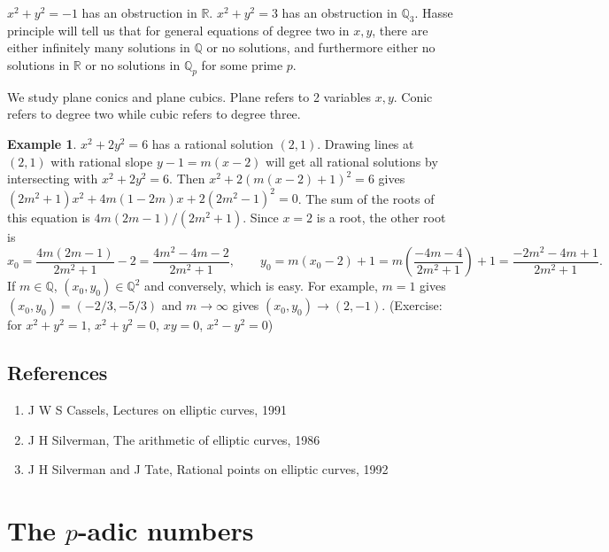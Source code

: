 \documentclass{article}
\newcommand{\Q}{\mathbb{Q}}
\newcommand{\R}{\mathbb{R}}
\newcommand{\rb}[1]{\left( #1 \right)}
\theoremstyle{definition}\newtheorem{definition}{Definition}[section]
\theoremstyle{definition}\newtheorem{remark}[definition]{Remark}
\theoremstyle{definition}\newtheorem*{example}{Example}
\theoremstyle{definition}\newtheorem*{note}{Note}
\begin{document}
$ x^2 + y^2 = -1 $ has an obstruction in $ \R $. $ x^2 + y^2 = 3 $ has an obstruction in $ \Q_3 $. Hasse principle will tell us that for general equations of degree two in $ x, y $, there are either infinitely many solutions in $ \Q $ or no solutions, and furthermore either no solutions in $ \R $ or no solutions in $ \Q_p $ for some prime $ p $.


We study plane conics and plane cubics. Plane refers to 2 variables $ x, y $. Conic refers to degree two while cubic refers to degree three.

\begin{example}
$ x^2 + 2y^2 = 6 $ has a rational solution $ \rb{2, 1} $. Drawing lines at $ \rb{2, 1} $ with rational slope $ y - 1 = m\rb{x - 2} $ will get all rational solutions by intersecting with $ x^2 + 2y^2 = 6 $. Then $ x^2 + 2\rb{m\rb{x - 2} + 1}^2 = 6 $ gives $ \rb{2m^2 + 1}x^2 + 4m\rb{1 - 2m}x + 2\rb{2m^2 - 1}^2 = 0 $. The sum of the roots of this equation is $ 4m\rb{2m - 1} / \rb{2m^2 + 1} $. Since $ x = 2 $ is a root, the other root is
$$ x_0 = \dfrac{4m\rb{2m - 1}}{2m^2 + 1} - 2 = \dfrac{4m^2 - 4m - 2}{2m^2 + 1}, \qquad y_0 = m\rb{x_0 - 2} + 1 = m\rb{\dfrac{-4m - 4}{2m^2 + 1}} + 1 = \dfrac{-2m^2 - 4m + 1}{2m^2 + 1}. $$
If $ m \in \Q $, $ \rb{x_0, y_0} \in \Q^2 $ and conversely, which is easy. For example, $ m = 1 $ gives $ \rb{x_0, y_0} = \rb{-2 / 3, -5 / 3} $ and $ m \to \infty $ gives $ \rb{x_0, y_0} \to \rb{2, -1} $. (Exercise: for $ x^2 + y^2 = 1 $, $ x^2 + y^2 = 0 $, $ xy = 0 $, $ x^2 - y^2 = 0 $)
\end{example}

\subsection{References}

\begin{enumerate}
\item J W S Cassels, Lectures on elliptic curves, 1991
\item J H Silverman, The arithmetic of elliptic curves, 1986
\item J H Silverman and J Tate, Rational points on elliptic curves, 1992
\end{enumerate}

\pagebreak

\section{The $ p $-adic numbers}
\end{document}
